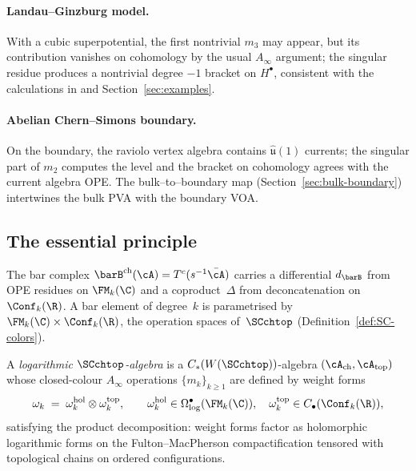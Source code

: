 \paragraph{\textbf{Landau–Ginzburg model.}}
With a cubic superpotential, the first nontrivial $m_3$ may appear, but its contribution vanishes on cohomology
by the usual $A_\infty$ argument; the singular residue produces a nontrivial degree $-1$ bracket on $H^\bullet$,
consistent with the calculations in \cite{GRW21} and Section~\ref{sec:examples}.

\paragraph{\textbf{Abelian Chern–Simons boundary.}}
On the boundary, the raviolo vertex algebra contains $\widehat{\mathfrak u}(1)$ currents; the singular part of $m_2$
computes the level and the bracket on cohomology agrees with the current algebra OPE.
The bulk–to–boundary map (Section~\ref{sec:bulk-boundary}) intertwines the bulk PVA with the boundary VOA.

\subsection{The essential principle}
\label{sec:bridge-principle}

The bar complex $\barB^{\mathrm{ch}}(\cA) = T^c(s^{-1}\bar\cA)$ carries a differential $d_{\barB}$ from OPE residues on $\FM_k(\C)$ and a coproduct~$\Delta$ from deconcatenation on $\Conf_k(\R)$. A bar element of degree~$k$ is parametrised by $\FM_k(\C) \times \Conf_k(\R)$, the operation spaces of~$\SCchtop$ (Definition~\ref{def:SC-colors}).

\begin{definition}
\label{def:log-SC-algebra}
A \emph{logarithmic $\SCchtop$-algebra} is a $C_\ast(W(\SCchtop))$-algebra $(\cA_{\mathrm{ch}}, \cA_{\mathrm{top}})$ whose closed-colour $A_\infty$ operations $\{m_k\}_{k \ge 1}$ are defined by weight forms
\[
 \omega_k \;=\; \omega_k^{\mathrm{hol}} \otimes \omega_k^{\mathrm{top}},
 \qquad
 \omega_k^{\mathrm{hol}} \in \Omega^\bullet_{\log}(\FM_k(\C)),
 \quad
 \omega_k^{\mathrm{top}} \in C_\bullet(\Conf_k(\R)),
\]
satisfying the product decomposition: weight forms factor as holomorphic logarithmic forms on the Fulton--MacPherson compactification tensored with topological chains on ordered configurations.
\end{definition}


